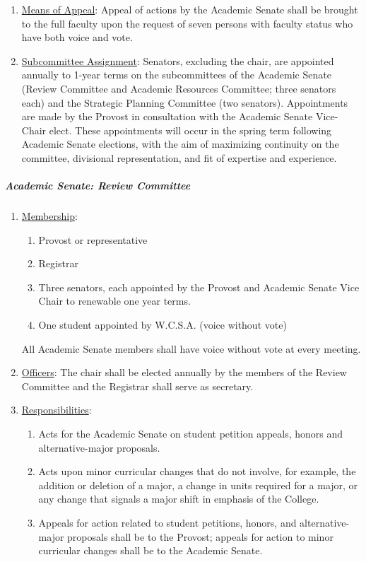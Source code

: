 \begin{enumerate}[label=\alph*)]
{\begin{enumerate}[label=\arabic*)]
							\end{enumerate}
						}
						\item{\underline{Means of Appeal}:  Appeal of actions by the Academic Senate shall be brought to the full faculty upon the request of seven persons with faculty status who have both voice and vote.}
						\item{\underline{Subcommittee Assignment}:  Senators, excluding the chair, are appointed annually to 1-year terms on the subcommittees of the Academic Senate (Review Committee and Academic Resources Committee; three senators each) and the Strategic Planning Committee (two senators).  Appointments are made by the Provost in consultation with the Academic Senate Vice-Chair elect.  These appointments will occur in the spring term following Academic Senate elections, with the aim of maximizing continuity on the committee, divisional representation, and fit of expertise and experience.}
					\end{enumerate}
				\subparagraph{Academic Senate:  Review Committee}
					\begin{enumerate}[label=\alph*)]
						\item{\underline{Membership}:
							\begin{enumerate}[label=\arabic*)]
								\item{Provost or representative}
								\item{Registrar}
								\item{Three senators, each appointed by the Provost and Academic Senate Vice Chair to renewable one year terms.}
								\item{One student appointed by W.C.S.A. (voice without vote)}
							\end{enumerate}
							All Academic Senate members shall have voice without vote at every meeting.
						}
						\item{\underline{Officers}:
							The chair shall be elected annually by the members of the Review Committee and the Registrar shall serve as secretary.
						}
						\item{\underline{Responsibilities}:
							\begin{enumerate}[label=\arabic*)]
								\item{Acts for the Academic Senate on student petition appeals, honors and alternative-major proposals.}
								\item{Acts upon minor curricular changes that do not involve, for example, the addition or deletion of a major, a change in units required for a major, or any change that signals a major shift in emphasis of the College.}
								\item{Appeals for action related to student petitions, honors, and alternative-major proposals shall be to the Provost; appeals for action to minor curricular changes shall be to the Academic Senate.}
							\end{enumerate}
						}
					\end{enumerate}
